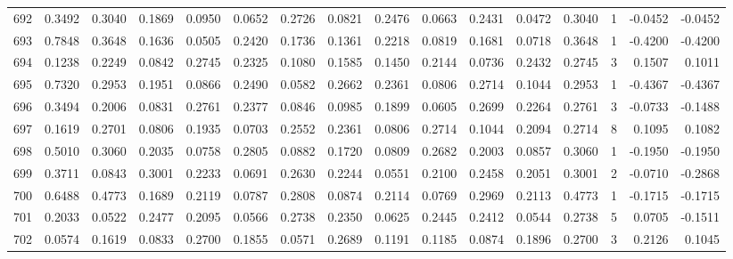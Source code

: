 \begin{tabular}{lrrrrrrrrrrrrrrr}
692 &      0.3492 &  0.3040 &  0.1869 &  0.0950 &  0.0652 &  0.2726 &  0.0821 &  0.2476 &  0.0663 &  0.2431 &   0.0472 &     0.3040 &      1 &                   -0.0452 &                    -0.0452 \\
693 &      0.7848 &  0.3648 &  0.1636 &  0.0505 &  0.2420 &  0.1736 &  0.1361 &  0.2218 &  0.0819 &  0.1681 &   0.0718 &     0.3648 &      1 &                   -0.4200 &                    -0.4200 \\
694 &      0.1238 &  0.2249 &  0.0842 &  0.2745 &  0.2325 &  0.1080 &  0.1585 &  0.1450 &  0.2144 &  0.0736 &   0.2432 &     0.2745 &      3 &                    0.1507 &                     0.1011 \\
695 &      0.7320 &  0.2953 &  0.1951 &  0.0866 &  0.2490 &  0.0582 &  0.2662 &  0.2361 &  0.0806 &  0.2714 &   0.1044 &     0.2953 &      1 &                   -0.4367 &                    -0.4367 \\
696 &      0.3494 &  0.2006 &  0.0831 &  0.2761 &  0.2377 &  0.0846 &  0.0985 &  0.1899 &  0.0605 &  0.2699 &   0.2264 &     0.2761 &      3 &                   -0.0733 &                    -0.1488 \\
697 &      0.1619 &  0.2701 &  0.0806 &  0.1935 &  0.0703 &  0.2552 &  0.2361 &  0.0806 &  0.2714 &  0.1044 &   0.2094 &     0.2714 &      8 &                    0.1095 &                     0.1082 \\
698 &      0.5010 &  0.3060 &  0.2035 &  0.0758 &  0.2805 &  0.0882 &  0.1720 &  0.0809 &  0.2682 &  0.2003 &   0.0857 &     0.3060 &      1 &                   -0.1950 &                    -0.1950 \\
699 &      0.3711 &  0.0843 &  0.3001 &  0.2233 &  0.0691 &  0.2630 &  0.2244 &  0.0551 &  0.2100 &  0.2458 &   0.2051 &     0.3001 &      2 &                   -0.0710 &                    -0.2868 \\
700 &      0.6488 &  0.4773 &  0.1689 &  0.2119 &  0.0787 &  0.2808 &  0.0874 &  0.2114 &  0.0769 &  0.2969 &   0.2113 &     0.4773 &      1 &                   -0.1715 &                    -0.1715 \\
701 &      0.2033 &  0.0522 &  0.2477 &  0.2095 &  0.0566 &  0.2738 &  0.2350 &  0.0625 &  0.2445 &  0.2412 &   0.0544 &     0.2738 &      5 &                    0.0705 &                    -0.1511 \\
702 &      0.0574 &  0.1619 &  0.0833 &  0.2700 &  0.1855 &  0.0571 &  0.2689 &  0.1191 &  0.1185 &  0.0874 &   0.1896 &     0.2700 &      3 &                    0.2126 &                     0.1045 \\

\end{tabular}
